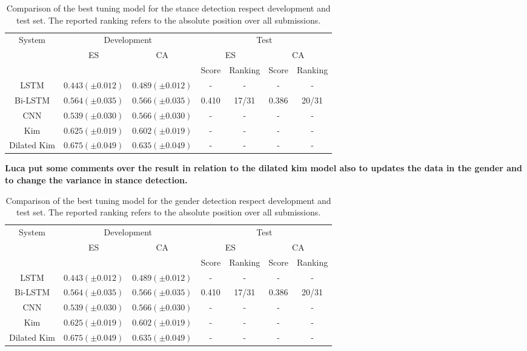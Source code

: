\begin{table}[h]
\footnotesize
\caption{Comparison of the best tuning model for the stance detection respect development and test set. The reported ranking refers to the absolute position over all submissions.}
\label{tab:stance}
\centering
\begin{tabular}{c|cc|cc|cc}
\toprule
\hline
\multirow{3}{*}{System}	& \multicolumn{2}{c|}{Development} & \multicolumn{4}{c}{Test}	\\
\cline{2-7}
						& \multirow{2}{*}{ES}	& \multirow{2}{*}{CA}	& \multicolumn{2}{c|}{ES} & \multicolumn{2}{c}{CA}	\\
\cline{4-7}
						&		&		& Score & Ranking & Score & Ranking \\
\hline
LSTM					& $0.443 (\pm0.012)$ & $0.489 (\pm0.012)$ & - & - & - & - \\
Bi-LSTM					& $0.564 (\pm0.035)$ & $0.566 (\pm0.035)$ & 0.410 & 17/31 & 0.386 & 20/31 \\
CNN						& $0.539 (\pm0.030)$ & $0.566 (\pm0.030)$ & - & - & - & - \\
Kim						& $0.625 (\pm0.019)$ & $0.602 (\pm0.019)$ & - & - & - & - \\
Dilated Kim				& $0.675 (\pm0.049)$ & $0.635 (\pm0.049)$ & - & - & - & - \\
\hline
\bottomrule
\end{tabular}
\end{table}

\textbf{Luca put some comments over the result in relation to the dilated kim model also to updates the data in the gender and to change the variance in stance detection.}


\begin{table}[h]
	\footnotesize
	\caption{Comparison of the best tuning model for the gender detection respect development and test set. The reported ranking refers to the absolute position over all submissions.}
	\label{tab:gender}
	\centering
	\begin{tabular}{c|cc|cc|cc}
		\toprule
		\hline
		\multirow{3}{*}{System}	& \multicolumn{2}{c|}{Development} & \multicolumn{4}{c}{Test}	\\
		\cline{2-7}
		& \multirow{2}{*}{ES}	& \multirow{2}{*}{CA}	& \multicolumn{2}{c|}{ES} & \multicolumn{2}{c}{CA}	\\
		\cline{4-7}
		&		&		& Score & Ranking & Score & Ranking \\
		\hline
		LSTM					& $0.443 (\pm0.012)$ & $0.489 (\pm0.012)$ & - & - & - & - \\
		Bi-LSTM					& $0.564 (\pm0.035)$ & $0.566 (\pm0.035)$ & 0.410 & 17/31 & 0.386 & 20/31 \\
		CNN						& $0.539 (\pm0.030)$ & $0.566 (\pm0.030)$ & - & - & - & - \\
		Kim						& $0.625 (\pm0.019)$ & $0.602 (\pm0.019)$ & - & - & - & - \\
		Dilated Kim				& $0.675 (\pm0.049)$ & $0.635 (\pm0.049)$ & - & - & - & - \\
		\hline
		\bottomrule
	\end{tabular}
\end{table}
